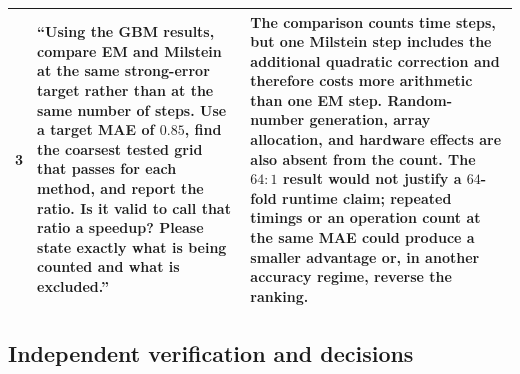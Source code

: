 \documentclass[11pt,a4paper]{article}
\theoremstyle{definition}
\theoremstyle{remark}
\begin{document}
\begin{tabular}{|p{}|p{}|p{}|}
3 &
``Using the GBM results, compare EM and Milstein at the same strong-error target rather than at the same number of steps. Use a target MAE of \(0.85\), find the coarsest tested grid that passes for each method, and report the ratio. Is it valid to call that ratio a speedup? Please state exactly what is being counted and what is excluded.'' &
The comparison counts time steps, but one Milstein step includes the additional quadratic correction and therefore costs more arithmetic than one EM step. Random-number generation, array allocation, and hardware effects are also absent from the count. The \(64{:}1\) result would not justify a \(64\)-fold runtime claim; repeated timings or an operation count at the same MAE could produce a smaller advantage or, in another accuracy regime, reverse the ranking. \\
\hline
\end{tabular}

\endgroup

\subsection{Independent verification and decisions}

\begingroup
\scriptsize
\setlength{\tabcolsep}{4pt}
\renewcommand{\arraystretch}{1.15}
\end{document}
